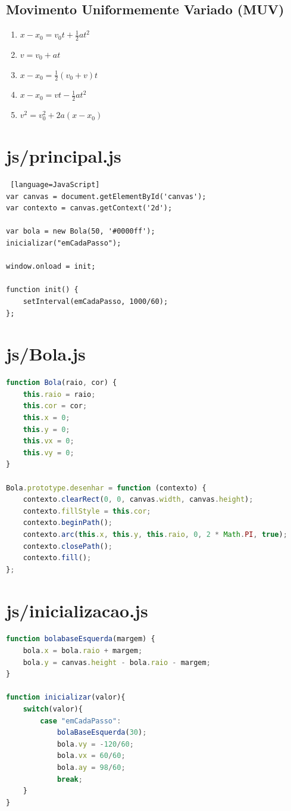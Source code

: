 \documentclass[12pt,a4paper,oneside]{article}
\begin{document}
\subsection{Movimento Uniformemente Variado (MUV)}

\begin{enumerate}
	\item $x - x_0 = v_0t + \frac{1}{2}at^2$ 
	\item $v = v_0 + at$ 
	\item $x - x_0 = \frac{1}{2}(v_0 + v)t$ 
	\item $x - x_0 = vt - \frac{1}{2} a t^2$
	\item $v^2 = v_0^2 + 2a(x - x_0)$
\end{enumerate}

\section*{js/principal.js}

\begin{lstlisting} [language=JavaScript]
var canvas = document.getElementById('canvas');
var contexto = canvas.getContext('2d');

var bola = new Bola(50, '#0000ff');
inicializar("emCadaPasso");

window.onload = init;

function init() {
	setInterval(emCadaPasso, 1000/60);
};
\end{lstlisting}

\newpage

\section*{js/Bola.js}

\begin{lstlisting}[language=JavaScript]
function Bola(raio, cor) {
	this.raio = raio;
	this.cor = cor;
	this.x = 0;
	this.y = 0;
	this.vx = 0;
	this.vy = 0;
}

Bola.prototype.desenhar = function (contexto) {
	contexto.clearRect(0, 0, canvas.width, canvas.height);
	contexto.fillStyle = this.cor;
	contexto.beginPath();
	contexto.arc(this.x, this.y, this.raio, 0, 2 * Math.PI, true);
	contexto.closePath();
	contexto.fill();
};
\end{lstlisting}

\section*{js/inicializacao.js}

\begin{lstlisting}[language=JavaScript]
function bolabaseEsquerda(margem) {
	bola.x = bola.raio + margem;
	bola.y = canvas.height - bola.raio - margem;
}

function inicializar(valor){
	switch(valor){
		case "emCadaPasso":
			bolaBaseEsquerda(30);
			bola.vy = -120/60; 
			bola.vx = 60/60;
			bola.ay = 98/60;
			break;
	}
}
\end{lstlisting}
\end{document}
